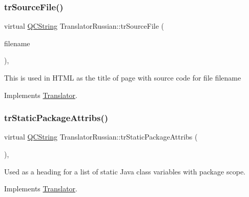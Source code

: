 \mbox{\label{class_translator_russian_a426363fce4e1a9c519698061f09e8c2b}} 
\subsubsection{\texorpdfstring{trSourceFile()}{trSourceFile()}}
{\footnotesize\ttfamily virtual \mbox{\hyperlink{class_q_c_string}{Q\+C\+String}} Translator\+Russian\+::tr\+Source\+File (\begin{DoxyParamCaption}\item[{\mbox{\hyperlink{class_q_c_string}{Q\+C\+String}} \&}]{filename }\end{DoxyParamCaption})\hspace{0.3cm}{\ttfamily [inline]}, {\ttfamily [virtual]}}

This is used in H\+T\+ML as the title of page with source code for file filename 

Implements \mbox{\hyperlink{class_translator}{Translator}}.

\mbox{\label{class_translator_russian_aa4bacd2c0b2444dfc5534111160beb84}} 
\subsubsection{\texorpdfstring{trStaticPackageAttribs()}{trStaticPackageAttribs()}}
{\footnotesize\ttfamily virtual \mbox{\hyperlink{class_q_c_string}{Q\+C\+String}} Translator\+Russian\+::tr\+Static\+Package\+Attribs (\begin{DoxyParamCaption}{ }\end{DoxyParamCaption})\hspace{0.3cm}{\ttfamily [inline]}, {\ttfamily [virtual]}}

Used as a heading for a list of static Java class variables with package scope. 

Implements \mbox{\hyperlink{class_translator}{Translator}}.

\mbox{\label{class_translator_russian_a8ab224755522496e52a42cd4d89b226c}} 
